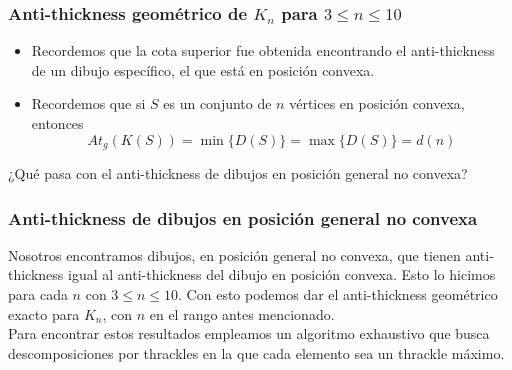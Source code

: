 \begin{frame}
\frametitle{Anti-thickness geométrico de $K_n$ para $3\leq n\leq 10$}
\begin{itemize}
	\item[] Recordemos que la cota superior fue obtenida encontrando el anti-thickness de un dibujo específico, el que está en posición convexa.
	\item[] Recordemos que si $S$ es un conjunto de $n$ vértices en posición convexa, entonces \[ At_g(K(S)) = \min\{D(S)\} = \max\{D(S)\} = d(n)\]
\end{itemize}
¿Qué pasa con el anti-thickness de dibujos en posición general no convexa?
\end{frame}

\begin{frame}
\frametitle{Anti-thickness de dibujos en posición general no convexa}
Nosotros encontramos dibujos, en posición general no convexa, que tienen anti-thickness igual al anti-thickness del dibujo en posición convexa. Esto lo hicimos para cada $n$ con $3\leq n \leq 10$. Con esto podemos dar el anti-thickness geométrico exacto para $K_n$, con $n$ en el rango antes mencionado. \\[15pt]

Para encontrar estos resultados empleamos un algoritmo exhaustivo que busca descomposiciones por thrackles en la que cada elemento sea un thrackle máximo.
\end{frame}